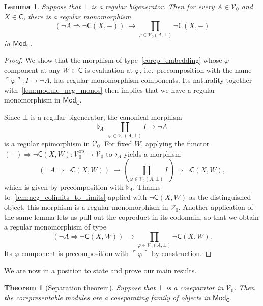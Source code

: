 \documentclass[11pt,onecolumn]{article}
\newcommand{\cV}{\mathscr{V}}
\newcommand{\cC}{\mathsf{C}}
\newcommand{\op}{\mathrm{op}}
\newcommand{\name}[1]{\ulcorner #1 \urcorner}
\newcommand{\Mod}{\mathsf{Mod}}
\theoremstyle{plain}
\newtheorem{theorem}{Theorem}[subsection]
\newtheorem{lem}[lem]{Lemma}
\theoremstyle{remark}
\theoremstyle{definition}
\begin{document}
\begin{lem}
	\label{lem:factor_corepresentable_embedding}
	Suppose that $\bot$ is a regular bigenerator.
	Then for every $A \in \cV_0$ and $X \in \cC$, there is a regular monomorphism
	\begin{equation}
		\label{corep_embedding}
		\left( \neg A \Rightarrow \neg \cC(X,-) \right)
		\:\longrightarrow
		\prod_{\varphi \in \cV_0(A,\bot)} \neg \cC(X,-)
	\end{equation}
	in $\Mod_\cC$.
\end{lem}

\begin{proof}
	We show that the morphism of type~\eqref{corep_embedding} whose $\varphi$-component at any $W \in \cC$ is evaluation at $\varphi$,
	i.e.~precomposition with the name $\name{\varphi} \colon I \to \neg A$, has regular monomorphism components.
	Its naturality together with~\cref{lem:module_neg_monos} then implies that we have a regular monomorphism in $\Mod_\cC$.

	Since $\bot$ is a regular bigenerator, the canonical morphism
	\[
		\flat_A \colon \coprod_{\varphi \in \cV_0(A,\bot)} I \longrightarrow \neg A
	\]
	is a regular epimorphism in $\cV_0$.
	For fixed $W$, applying the functor $(-)\Rightarrow\neg\cC(X, W)\colon\cV_0^\op\to\cV_0$ to $\flat_A$ yields a morphism
	\[
		\left( \neg A \Rightarrow \neg \cC(X,W) \right)
		\:\longrightarrow
		\left( \coprod_{\varphi \in \cV_0(A,\bot)} I \right) \Rightarrow \neg \cC(X,W),
	\]
	which is given by precomposition with $\flat_A$.
	Thanks to~\cref{lem:neg_colimits_to_limits} applied with $\neg \cC(X,W)$ as the distinguished object, 
	this morphism is a regular monomorphism in $\cV_0$.
	Another application of the same lemma lets us pull out the coproduct in its codomain, so that we obtain a regular monomorphism of type
	\begin{equation}
		\label{corep_embedding_pointwise}
		\left( \neg A \Rightarrow \neg \cC(X,W) \right)
		\:\longrightarrow
		\prod_{\varphi \in \cV_0(A,\bot)} \neg \cC(X,W).
	\end{equation}
	Its $\varphi$-component is precomposition with $\name{\varphi}$ by construction.
\end{proof}

We are now in a position to state and prove our main results.

\begin{theorem}[Separation theorem]
	\label{separation}
	Suppose that $\bot$ is a coseparator in $\cV_0$.
	Then the corepresentable modules are a coseparating family of objects in $\Mod_\cC$.
\end{theorem}
\end{document}

